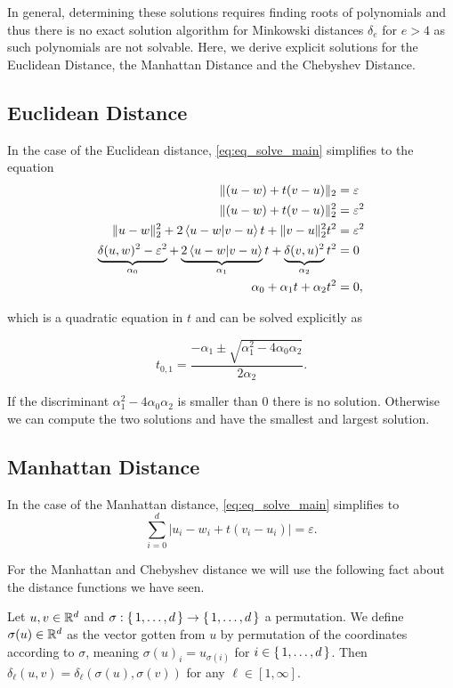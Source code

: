 In general, determining these solutions requires finding roots of polynomials and thus there is no exact solution algorithm for Minkowski distances \(\delta_e\) for \(e > 4\) as such polynomials are not solvable. Here, we derive explicit solutions for the Euclidean Distance, the Manhattan Distance and the Chebyshev Distance. 

\subsection{Euclidean Distance}
\label{subsubsec:eq_euclidean_distance}
In the case of the Euclidean distance, \cref{eq:eq_solve_main} simplifies to the equation 
\begin{align*}
  \| (u - w) + t(v - u) \|_2 &= \varepsilon \\
  \| (u - w) + t(v - u) \|_2^2 &= \varepsilon^2 \\
  \| u - w \|_2^2 + 2\braket{u - w | v - u} t  +  \| v - u \|_2^2 t^2 &= \varepsilon^2 \\
  \underbrace{\delta(u,w)^2 - \varepsilon^2}_{\alpha_0} + \underbrace{2\braket{u - w | v - u} }_{\alpha_1}t  +  \underbrace{\delta(v, u)^2}_{\alpha_2} t^2 &= 0 \\
  \alpha_0 + \alpha_1 t  + \alpha_2 t^2 &= 0,
\end{align*}

which is a quadratic equation in \(t\) and can be solved explicitly as 

\begin{equation}
  t_{0,1} = \frac{-\alpha_1 \pm \sqrt{\alpha_1^2 - 4\alpha_0\alpha_2}}{2\alpha_2}.\label{eq:sol_explicit_euclidean}
\end{equation}

If the discriminant \(\alpha_1^2 - 4\alpha_0\alpha_2\) is smaller than \(0\) there is no solution. Otherwise we can compute the two solutions and have the smallest and largest solution. 


\subsection{Manhattan Distance}
\label{subsubsec:eq_manhattan_distance}
In the case of the Manhattan distance, \cref{eq:eq_solve_main} simplifies to 
\begin{equation}
  \sum_{i=0}^d |u_i - w_i + t (v_i - u_i)| = \varepsilon. \label{eq:solve_manhattan}
\end{equation}

For the Manhattan and Chebyshev distance we will use the following fact about the distance functions we have seen. 
\begin{observation}\label{obs:permute-coordinates}
  Let \(u, v \in \mathbb{R}^d\) and \(\sigma: \set{1, \dots, d} \to \set{1, \dots, d}\) a permutation. We define \(\sigma(u) \in \mathbb{R}^d\) as the vector gotten from \(u\) by permutation of the coordinates according to \(\sigma\), meaning \(\sigma(u)_i = u_{\sigma(i)}\) for \(i \in \set{1, \dots, d}\). Then \(\delta_\ell(u, v) = \delta_\ell(\sigma(u), \sigma(v))\) for any \(\ell \in [1, \infty]\).
\end{observation}

